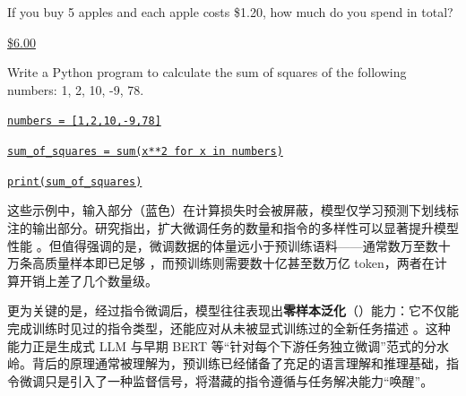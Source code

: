 \vspace{0.5em}
\begin{tcolorbox}
\begin{center}
\parbox{0.9\textwidth}{
{\color{blue} If you buy 5 apples and each apple costs \$1.20, how much do you spend in total?}

\vspace{0.3em}
\underline{\$6.00}
}
\end{center}
\end{tcolorbox}

\vspace{0.5em}
\begin{tcolorbox}
\begin{center}
\parbox{0.9\textwidth}{
{\color{blue} Write a Python program to calculate the sum of squares of the following numbers: 1, 2, 10, -9, 78.}

\vspace{0.3em}
\underline{\texttt{numbers = [1,2,10,-9,78]}}

\underline{\texttt{sum\_of\_squares = sum(x**2 for x in numbers)}}

\underline{\texttt{print(sum\_of\_squares)}}
}
\end{center}
\end{tcolorbox}
\vspace{0.5em}

这些示例中，输入部分（蓝色）在计算损失时会被屏蔽，模型仅学习预测下划线标注的输出部分。研究指出，扩大微调任务的数量和指令的多样性可以显著提升模型性能 \cite{chung-etal:2022scaling}。但值得强调的是，微调数据的体量远小于预训练语料——通常数万至数十万条高质量样本即已足够 \cite{zhou-etal:2023lima}，而预训练则需要数十亿甚至数万亿 token，两者在计算开销上差了几个数量级。

更为关键的是，经过指令微调后，模型往往表现出\textbf{零样本泛化}（）能力：它不仅能完成训练时见过的指令类型，还能应对从未被显式训练过的全新任务描述 \cite{sanh-etal:2022multitask,wei-etal:2022finetuned}。这种能力正是生成式 LLM 与早期 BERT 等“针对每个下游任务独立微调”范式的分水岭。背后的原理通常被理解为，预训练已经储备了充足的语言理解和推理基础，指令微调只是引入了一种监督信号，将潜藏的指令遵循与任务解决能力“唤醒”。

